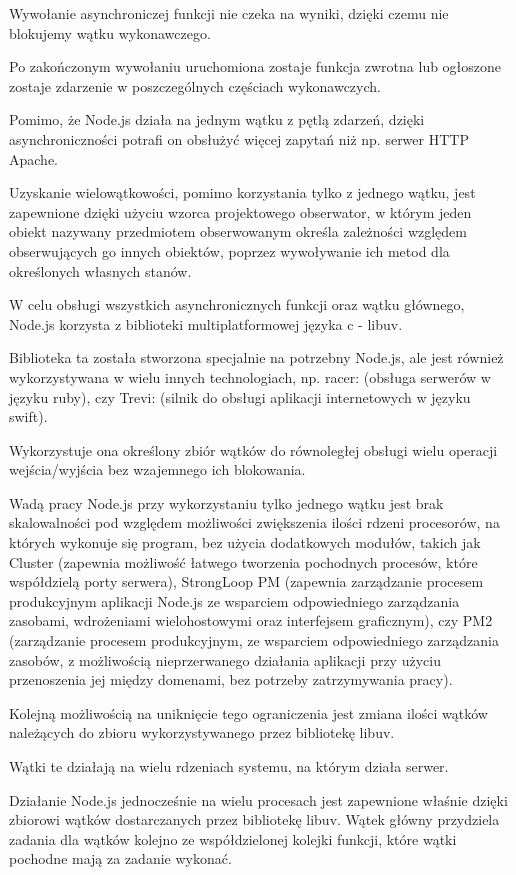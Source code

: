 \documentclass[12pt]{report}
\begin{document}
Wywołanie asynchroniczej funkcji nie czeka na wyniki, dzięki czemu nie blokujemy wątku wykonawczego.

Po zakończonym wywołaniu uruchomiona zostaje funkcja zwrotna lub ogłoszone zostaje zdarzenie w poszczególnych częściach wykonawczych.

Pomimo, że Node.js działa na jednym wątku z pętlą zdarzeń, dzięki asynchroniczności potrafi on obsłużyć więcej zapytań niż np.
serwer HTTP Apache.

Uzyskanie wielowątkowości, pomimo korzystania tylko z jednego wątku, jest zapewnione dzięki użyciu wzorca projektowego obserwator, w którym jeden obiekt nazywany przedmiotem obserwowanym określa zależności względem obserwujących go innych obiektów, poprzez wywoływanie ich metod dla określonych własnych stanów.

W celu obsługi wszystkich asynchronicznych funkcji oraz wątku głównego, Node.js korzysta z biblioteki multiplatformowej języka c - libuv.

Biblioteka ta została stworzona specjalnie na potrzebny Node.js, ale jest również wykorzystywana w wielu innych technologiach, np.
racer: (obsługa serwerów w języku ruby), czy Trevi: (silnik do obsługi aplikacji internetowych w języku swift).

Wykorzystuje ona określony zbiór wątków do równoległej obsługi wielu operacji wejścia/wyjścia bez wzajemnego ich blokowania.

Wadą pracy Node.js przy wykorzystaniu tylko jednego wątku jest brak skalowalności pod względem możliwości zwiększenia ilości rdzeni procesorów, na których wykonuje się program, bez użycia dodatkowych modułów, takich jak Cluster (zapewnia możliwość łatwego tworzenia pochodnych procesów, które współdzielą porty serwera), StrongLoop PM (zapewnia zarządzanie procesem produkcyjnym aplikacji Node.js ze wsparciem odpowiedniego zarządzania zasobami, wdrożeniami wielohostowymi oraz interfejsem graficznym), czy PM2 (zarządzanie procesem produkcyjnym, ze wsparciem odpowiedniego zarządzania zasobów, z możliwością nieprzerwanego działania aplikacji przy użyciu przenoszenia jej między domenami, bez potrzeby zatrzymywania pracy).

Kolejną możliwością na uniknięcie tego ograniczenia jest zmiana ilości wątków należących do zbioru wykorzystywanego przez bibliotekę libuv.

Wątki te działają na wielu rdzeniach systemu, na którym działa serwer.

Działanie Node.js jednocześnie na wielu procesach jest zapewnione właśnie dzięki zbiorowi wątków dostarczanych przez bibliotekę libuv.
Wątek główny przydziela zadania dla wątków kolejno ze współdzielonej kolejki funkcji, które wątki pochodne mają za zadanie wykonać.
\end{document}
